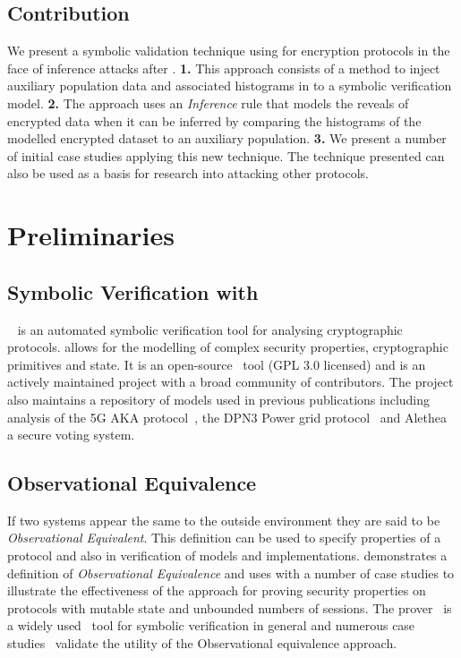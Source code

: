 \documentclass[journal]{IEEEtran}
\begin{document}


\subsection{Contribution}
We present a symbolic validation technique using \tamarin{} for encryption protocols in the face of inference attacks after \cite{InfrenceAttacks}. \textbf{1.} This approach consists of a method to inject auxiliary population data and associated histograms in to a symbolic verification model. \textbf{2.} The approach uses an \textit{Inference} rule that models the reveals of encrypted data when it can be inferred by comparing the histograms of the modelled encrypted dataset to an auxiliary population. \textbf{3.} We present a number of initial case studies applying this new technique.
The technique presented can also be used as a basis for research into attacking other protocols.

\section{Preliminaries}

\subsection{Symbolic Verification with \tamarin{}}
\tamarin{}~\cite{Meier2013} is an automated symbolic verification tool for analysing cryptographic protocols. \tamarin{} allows for the modelling of complex security properties, cryptographic primitives and state. It is an open-source~\cite{TamarinGithub} tool (GPL 3.0 licensed) and is an actively maintained project with a broad community of contributors. The project also maintains a repository of models used in previous publications including analysis of the 5G AKA protocol~\cite{5GAKA}, the DPN3 Power grid protocol~\cite{DNP3} and Alethea~\cite{Alethea} a secure voting system.

\subsection{Observational Equivalence}
If two systems appear the same to the outside environment they are said to be \textit{Observational Equivalent}.
This definition can be used to specify properties of a protocol and also in verification of models and implementations. 
\cite{ObsEqvCCS15} demonstrates a definition of \textit{Observational Equivalence} and uses \tamarin{} with a number of case studies to illustrate the effectiveness of the approach for proving security properties on protocols with mutable state and unbounded numbers of sessions. The \tamarin{} prover~\cite{Schmidt2012AutomatedProperties} is a widely used~\cite{ARPKICCS14, Donenfeld} tool for symbolic verification in general and numerous case studies~\cite{Norwegian,5GAKA} validate the utility of the Observational equivalence approach.
\end{document}
